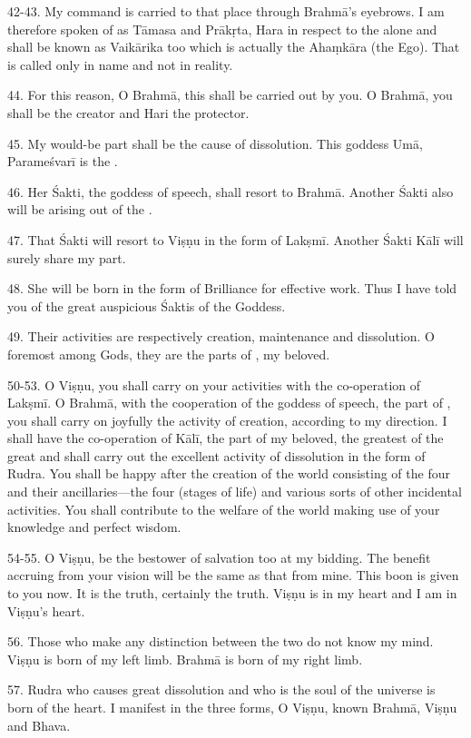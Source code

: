 42-43. My command is carried to that place through Brahmā’s eyebrows. I am
therefore spoken of as Tāmasa and Prākṛta, Hara in respect to the 
alone and shall be known as Vaikārika too which is actually the Ahaṃkāra
(the Ego). That is called  only in name and not in reality.

44. For this reason, O Brahmā, this shall be carried out by you. O Brahmā, you
shall be the creator and Hari the protector.

45. My would-be part shall be the cause of dissolution. This goddess Umā,
Parameśvarī is the .

46. Her Śakti, the goddess of speech, shall resort to Brahmā. Another Śakti also
will be arising out of the .

47. That Śakti will resort to Viṣṇu in the form of Lakṣmī. Another Śakti Kālī
will surely share my part.

48. She will be born in the form of Brilliance for effective work. Thus I have
told you of the great auspicious Śaktis of the Goddess.

49. Their activities are respectively creation, maintenance and dissolution. O
foremost among Gods, they are the parts of , my beloved.

50-53. O Viṣṇu, you shall carry on your activities with the co-operation of
Lakṣmī. O Brahmā, with the cooperation of the goddess of speech, the part of
, you shall carry on joyfully the activity of creation, according to
my direction. I shall have the co-operation of Kālī, the part of my beloved,
the greatest of the great and shall carry out the excellent activity of
dissolution in the form of Rudra. You shall be happy after the creation of
the world consisting of the four  and their ancillaries—the four
 (stages of life) and various sorts of other incidental activities.
You shall contribute to the welfare of the world making use of your knowledge
and perfect wisdom.

54-55. O Viṣṇu, be the bestower of salvation too at my bidding. The benefit
accruing from your vision will be the same as that from mine. This boon is given
to you now. It is the truth, certainly the truth. Viṣṇu is in my heart and I am
in Viṣṇu’s heart.

56. Those who make any distinction between the two do not know my mind. Viṣṇu is
born of my left limb. Brahmā is born of my right limb.

57. Rudra who causes great dissolution and who is the soul of the universe is
born of the heart. I manifest in the three forms, O Viṣṇu, known Brahmā, Viṣṇu
and Bhava.

